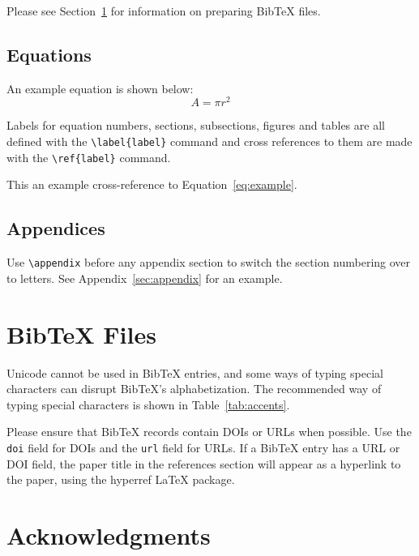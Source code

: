 \documentclass[11pt]{article}
\begin{document}
Please see Section~\ref{sec:bibtex} for information on preparing Bib\TeX{} files.

\subsection{Equations}

An example equation is shown below:
\begin{equation}
  \label{eq:example}
  A = \pi r^2
\end{equation}

Labels for equation numbers, sections, subsections, figures and tables
are all defined with the \verb|\label{label}| command and cross references
to them are made with the \verb|\ref{label}| command.

This an example cross-reference to Equation~\ref{eq:example}.

\subsection{Appendices}

Use \verb|\appendix| before any appendix section to switch the section numbering over to letters. See Appendix~\ref{sec:appendix} for an example.

\section{Bib\TeX{} Files}
\label{sec:bibtex}

Unicode cannot be used in Bib\TeX{} entries, and some ways of typing special characters can disrupt Bib\TeX's alphabetization. The recommended way of typing special characters is shown in Table~\ref{tab:accents}.

Please ensure that Bib\TeX{} records contain DOIs or URLs when possible.
Use the \verb|doi| field for DOIs and the \verb|url| field for URLs.
If a Bib\TeX{} entry has a URL or DOI field, the paper title in the references section will appear as a hyperlink to the paper, using the hyperref \LaTeX{} package.

\section*{Acknowledgments}
\end{document}
